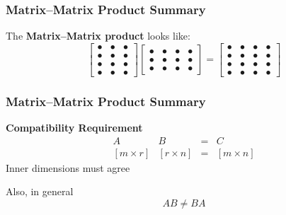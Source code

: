 \documentclass[10pt]{beamer}
\newcommand{\matdim}[2]{\ensuremath{#1\times#2}}
\begin{document}
\begin{frame}
\frametitle{Matrix--Matrix Product Summary}

The \textbf{Matrix--Matrix product} looks like:
\begin{equation*}
    \begin{bmatrix}\bullet & \bullet & \bullet \\
                    \bullet & \bullet & \bullet \\
                    \bullet & \bullet & \bullet \\
                    \bullet & \bullet & \bullet \end{bmatrix}
    \begin{bmatrix}\bullet & \bullet & \bullet & \bullet \\
                    \bullet & \bullet & \bullet & \bullet \\
                    \bullet & \bullet & \bullet & \bullet \end{bmatrix}
    =
    \begin{bmatrix}\bullet & \bullet & \bullet & \bullet  \\
                    \bullet & \bullet & \bullet & \bullet \\
                    \bullet & \bullet & \bullet & \bullet \\
                    \bullet & \bullet & \bullet & \bullet \end{bmatrix}
\end{equation*}


\end{frame}
\begin{frame}
\frametitle{Matrix--Matrix Product Summary}


\textbf{Compatibility Requirement}
\begin{equation*}
    \begin{array}{cccc}
                A       &        B        & = & C \\[3pt]
        [\matdim{m}{r}] & [\matdim{r}{n}] & = & [\matdim{m}{n}]
    \end{array}
\end{equation*}
Inner dimensions must agree


Also, in general
\begin{equation*}
    AB \neq BA
\end{equation*}

\end{frame}
\end{document}
